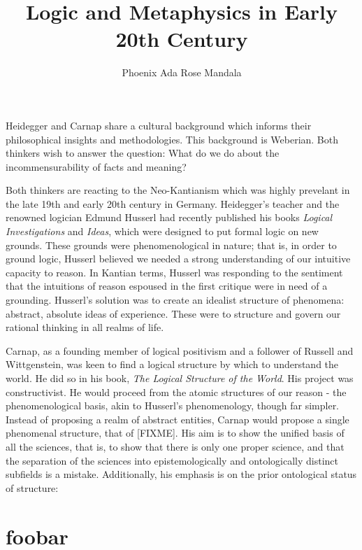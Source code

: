 \documentclass[leqno, 12pt]{turabian-researchpaper}
\title{Logic and Metaphysics in Early 20th Century}
\author{Phoenix Ada Rose Mandala}
\begin{document}
	\maketitle

	Heidegger and Carnap share a cultural background which informs their
	philosophical insights and methodologies. This background is Weberian. Both
	thinkers wish to answer the question: What do we do about the incommensurability
	of facts and meaning?

	Both thinkers are reacting to the Neo-Kantianism which was highly prevelant in
	the late 19th and early 20th century in Germany. Heidegger's teacher and the
	renowned logician Edmund Husserl had recently published his books \textit{Logical
	Investigations} and \textit{Ideas}, which were designed to put formal logic on
	new grounds. These grounds were phenomenological in nature; that is, in order
	to ground logic, Husserl believed we needed a strong understanding of our intuitive
	capacity to reason. In Kantian terms, Husserl was responding to the sentiment that
	the intuitions of reason espoused in the first critique were in need of a grounding.
	Husserl's solution was to create an idealist structure of phenomena: abstract,
	absolute ideas of experience. These were to structure and govern our rational thinking
	in all realms of life.

	Carnap, as a founding member of logical positivism and a follower of Russell
	and Wittgenstein, was keen to find a logical structure by which to understand the
	world. He did so in his book, \textit{The Logical Structure of the World}. His
	project was constructivist. He would proceed from the atomic structures of our
	reason - the phenomenological basis, akin to Husserl's phenomenology, though
	far simpler. Instead of proposing a realm of abstract entities, Carnap would
	propose a single phenomenal structure, that of [FIXME]. His aim is to show the
	unified basis of all the sciences, that is, to show that there is only one
	proper science, and that the separation of the sciences into epistemologically
	and ontologically distinct subfields is a mistake. Additionally, his emphasis is
	on the prior ontological status of structure: 

	\section{foobar}

	\clearpage
	\printbibliography
\end{document}
